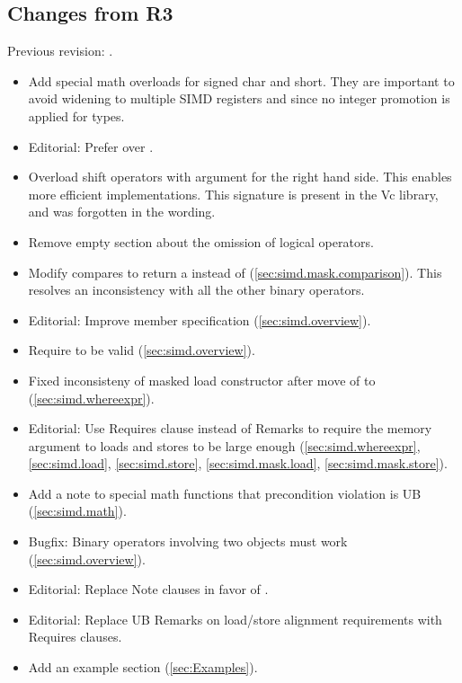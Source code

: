 \subsection{Changes from R3}
Previous revision: \parencite{P0214R3}.
\begin{itemize}
  \item Add special math overloads for signed char and short.
        They are important to avoid widening to multiple SIMD registers and since no integer promotion is applied for \simd types.
  \item Editorial: Prefer  over .
  \item Overload shift operators with \intt argument for the right hand side.
        This enables more efficient implementations.
        This signature is present in the Vc library, and was forgotten in the wording.
  \item Remove empty section about the omission of logical operators.
  \item Modify \mask compares to return a \mask instead of \bool (\ref{sec:simd.mask.comparison}).
        This resolves an inconsistency with all the other binary operators.
  \item Editorial: Improve  member specification (\ref{sec:simd.overview}).
  \item Require  to be valid (\ref{sec:simd.overview}).
  \item Fixed inconsisteny of masked load constructor after move of  to  (\ref{sec:simd.whereexpr}).
  \item Editorial: Use Requires clause instead of Remarks to require the memory argument to loads and stores to be large enough (\ref{sec:simd.whereexpr}, \ref{sec:simd.load}, \ref{sec:simd.store}, \ref{sec:simd.mask.load}, \ref{sec:simd.mask.store}).
  \item Add a note to special math functions that precondition violation is UB (\ref{sec:simd.math}).
  \item Bugfix: Binary operators involving two  objects must work (\ref{sec:simd.overview}).
  \item Editorial: Replace Note clauses in favor of \wgNote{}.
  \item Editorial: Replace UB Remarks on load/store alignment requirements with Requires clauses.
  \item Add an example section (\ref{sec:Examples}).

\end{itemize}
